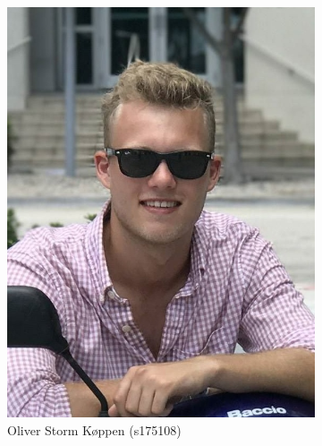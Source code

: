 \begin{figure}[H]
	\begin{subfigure}{0.25\textwidth}
		\includegraphics[width=\linewidth]{graphics/members/oliver}
		\caption*{Oliver Storm Køppen (s175108)}
	\end{subfigure}\hfil
	\begin{subfigure}{0.25\textwidth}

\end{subfigure}
\end{figure}
